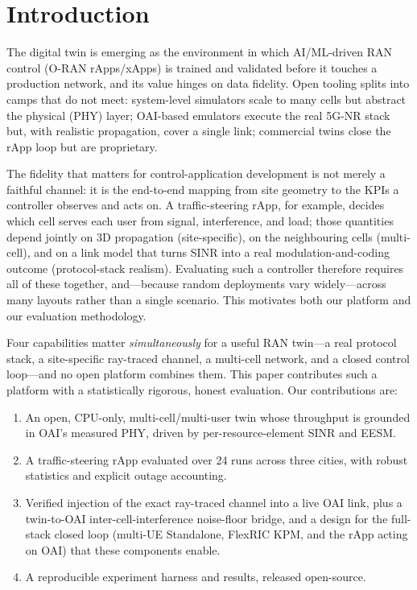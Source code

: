 \documentclass[conference]{IEEEtran}
\begin{document}
\section{Introduction}
The digital twin is emerging as the environment in which AI/ML-driven RAN control
(O-RAN rApps/xApps) is trained and validated before it touches a production
network, and its value hinges on data fidelity. Open tooling splits into camps that
do not meet: system-level simulators scale to many cells but abstract the physical
(PHY) layer; OAI-based emulators execute the real 5G-NR stack but, with realistic
propagation, cover a single link; commercial twins close the rApp loop but are
proprietary.

The fidelity that matters for control-application development is not merely a
faithful channel: it is the end-to-end mapping from site geometry to the KPIs a
controller observes and acts on. A traffic-steering rApp, for example, decides
which cell serves each user from signal, interference, and load; those quantities
depend jointly on 3D propagation (site-specific), on the neighbouring cells
(multi-cell), and on a link model that turns SINR into a real modulation-and-coding
outcome (protocol-stack realism). Evaluating such a controller therefore requires
all of these together, and---because random deployments vary widely---across many
layouts rather than a single scenario. This motivates both our platform and our
evaluation methodology.

Four capabilities matter \emph{simultaneously} for a useful RAN twin---a real
protocol stack, a site-specific ray-traced channel, a multi-cell network, and a
closed control loop---and no open platform combines them. This paper contributes
such a platform with a statistically rigorous, honest evaluation. Our
contributions are:
\begin{enumerate}
\item An open, CPU-only, multi-cell/multi-user twin whose throughput is grounded in
OAI's measured PHY, driven by per-resource-element SINR and EESM.
\item A traffic-steering rApp evaluated over 24 runs across three cities, with
robust statistics and explicit outage accounting.
\item Verified injection of the exact ray-traced channel into a live OAI link, plus
a twin-to-OAI inter-cell-interference noise-floor bridge, and a design for the
full-stack closed loop (multi-UE Standalone, FlexRIC KPM, and the rApp acting on
OAI) that these components enable.
\item A reproducible experiment harness and results, released open-source.
\end{enumerate}
\end{document}
